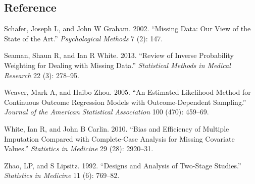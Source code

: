 \documentclass[
  12pt,
]{article}
\newlength{\cslhangindent}
\newlength{\cslentryspacingunit} %
\newenvironment{CSLReferences}[2] %
 {%
  \setlength{\parindent}{0pt}
  \ifodd #1
  \let\oldpar\par
  \def\par{\hangindent=\cslhangindent\oldpar}
  \fi
  \setlength{\parskip}{#2\cslentryspacingunit}
 }%
 {}
\begin{document}
\hypertarget{reference}{%
\subsection*{Reference}\label{reference}}

\hypertarget{refs}{}
\begin{CSLReferences}{1}{0}
\leavevmode{}%
Schafer, Joseph L, and John W Graham. 2002. {``Missing Data: Our View of
the State of the Art.''} \emph{Psychological Methods} 7 (2): 147.

\leavevmode{}%
Seaman, Shaun R, and Ian R White. 2013. {``Review of Inverse Probability
Weighting for Dealing with Missing Data.''} \emph{Statistical Methods in
Medical Research} 22 (3): 278--95.

\leavevmode{}%
Weaver, Mark A, and Haibo Zhou. 2005. {``An Estimated Likelihood Method
for Continuous Outcome Regression Models with Outcome-Dependent
Sampling.''} \emph{Journal of the American Statistical Association} 100
(470): 459--69.

\leavevmode{}%
White, Ian R, and John B Carlin. 2010. {``Bias and Efficiency of
Multiple Imputation Compared with Complete-Case Analysis for Missing
Covariate Values.''} \emph{Statistics in Medicine} 29 (28): 2920--31.

\leavevmode{}%
Zhao, LP, and S Lipsitz. 1992. {``Designs and Analysis of Two-Stage
Studies.''} \emph{Statistics in Medicine} 11 (6): 769--82.

\end{CSLReferences}
\end{document}

